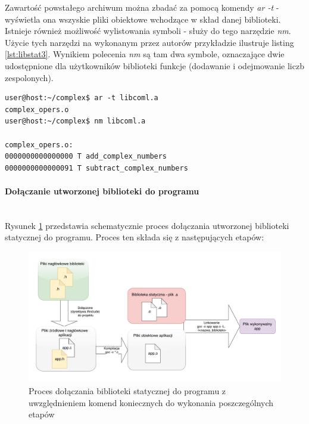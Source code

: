 Zawartość powstałego archiwum można zbadać za pomocą komendy \textit{ar -t} - wyświetla ona wszyskie pliki obiektowe wchodzące w skład danej biblioteki. Istnieje również możliwość wylistowania symboli - służy do tego narzędzie \textit{nm}. Użycie tych narzędzi na wykonanym przez autorów przykładzie ilustruje listing \ref{lst:libstat3}. Wynikiem polecenia \textit{nm} są tam dwa symbole, oznaczające dwie udostępnione dla użytkowników biblioteki funkcje (dodawanie i odejmowanie liczb zespolonych).

\begin{lstlisting}[style=Cmd, caption={Użycie poleceń \textit{ar -t} oraz \textit{nm} na bibliotece statycznej.},label={lst:libstat3}]
user@host:~/complex$ ar -t libcoml.a
complex_opers.o
user@host:~/complex$ nm libcoml.a

complex_opers.o:
0000000000000000 T add_complex_numbers
0000000000000091 T subtract_complex_numbers
\end{lstlisting}

\newpage
\paragraph*{Dołączanie utworzonej biblioteki do programu}\mbox{}\\
Rysunek \ref{fig:staticliblink} przedstawia schematycznie proces dołączania utworzonej biblioteki statycznej do programu. Proces ten składa się z następujących etapów:

\begin{figure}[H]
\centering
\caption{Proces dołączania biblioteki statycznej do programu z uwzględnieniem komend koniecznych do wykonania poszczególnych etapów \cite{Compiling}}
\label{fig:staticliblink}
\includegraphics[width=\textwidth]{res/StaticLibLink}
\end{figure}

